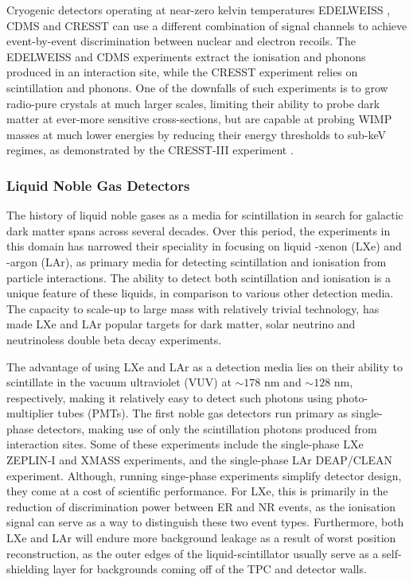 {Cryogenic detectors operating at near-zero kelvin temperatures EDELWEISS \cite{edelweiss}, CDMS \cite{cdms} and CRESST \cite{cresst} can use a different combination of signal channels to achieve event-by-event discrimination between nuclear and electron recoils. The EDELWEISS and CDMS experiments extract the ionisation and phonons produced in an interaction site, while the CRESST experiment relies on scintillation and phonons. One of the downfalls of such experiments is to grow radio-pure crystals at much larger scales, limiting their ability to probe dark matter at ever-more sensitive cross-sections, but are capable at probing WIMP masses at much lower energies by reducing their energy thresholds to sub-keV regimes, as demonstrated by the CRESST-III experiment \cite{cresst_3}. 

\subsubsection{Liquid Noble Gas Detectors}
\label{subsec:liquid_noble_gas}

The history of liquid noble gases as a media for scintillation in search for galactic dark matter spans across several decades. Over this period, the experiments in this domain has narrowed their speciality in focusing on liquid -xenon (LXe) and -argon (LAr), as primary media for detecting scintillation and ionisation from particle interactions. The ability to detect both scintillation and ionisation is a unique feature of these liquids, in comparison to various other detection media. The capacity to scale-up to large mass with relatively trivial technology, has made LXe and LAr popular targets for dark matter, solar neutrino and neutrinoless double beta decay experiments. 

The advantage of using LXe and LAr as a detection media lies on their ability to scintillate in the vacuum ultraviolet (VUV) at $\sim178$ nm and $\sim128$ nm, respectively, making it relatively easy to detect such photons using photo-multiplier tubes (PMTs). The first noble gas detectors run primary as single-phase detectors, making use of only the scintillation photons produced from interaction sites. Some of these experiments include the single-phase LXe ZEPLIN-I \cite{zeplin_1} and XMASS \cite{xmass} experiments, and the single-phase LAr DEAP/CLEAN \cite{deap} experiment. Although, running singe-phase experiments simplify detector design, they come at a cost of scientific performance. For LXe, this is primarily in the reduction of discrimination power between ER and NR events, as the ionisation signal can serve as a way to distinguish these two event types. Furthermore, both LXe and LAr will endure more background leakage as a result of worst position reconstruction, as the outer edges of the liquid-scintillator usually serve as a self-shielding layer for backgrounds coming off of the TPC and detector walls.

}
